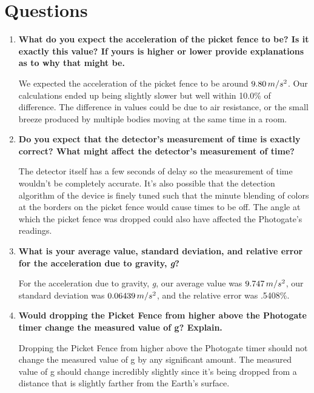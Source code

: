
 \section{Questions}

\vspace{-0.5cm}
\singlespacing

\begin{enumerate}
	\item \textbf{What do you expect the acceleration of the picket fence to be? Is it exactly this value? If yours is higher or lower provide explanations as to why that might be.}

		We expected the acceleration of the picket fence to be around $9.80\thinspace{m/s^2}$. Our calculations ended up being slightly slower but well within 10.0\% of difference. The difference in values could be due to air resistance, or the small breeze produced by multiple bodies moving at the same time in a room.

	\item \textbf{Do you expect that the detector's measurement of time is exactly correct? What might affect the detector's measurement of time?}

	The detector itself has a few seconds of delay so the measurement of time wouldn't be completely accurate. It's also possible that the detection algorithm of the device is finely tuned such that the minute blending of colors at the borders on the picket fence would cause times to be off. The angle at which the picket fence was dropped could also have affected the Photogate's readings.

\item \textbf{What is your average value, standard deviation, and relative error for the acceleration due to gravity, \textit{g}?}

		For the acceleration due to gravity, \textit{g}, our average value was \textbf{$9.747\thinspace{m/s^2}$}, our standard deviation was \textbf{$0.06439\thinspace{m/s^2}$}, and the relative error was .5408\%.

\item \textbf{Would dropping the Picket Fence from higher above the Photogate timer change the measured value of g? Explain.}

	Dropping the Picket Fence from higher above the Photogate timer should not change the measured value of g by any significant amount. The measured value of g should change incredibly slightly since it's being dropped from a distance that is slightly farther from the Earth's surface.


\end{enumerate}
